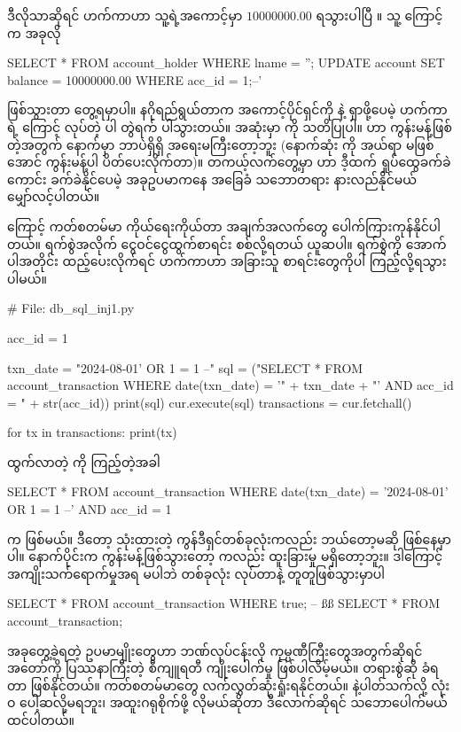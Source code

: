 ဒီလိုသာဆိုရင် ဟက်ကာဟာ သူ့ရဲ့အကောင့်မှာ $10000000.00$ ရသွားပါပြီ \fEn{(!)}။ သူ့  ကြောင့်  က အခုလို
\begin{sql}
SELECT * FROM account_holder WHERE lname = '';
UPDATE account SET balance = 10000000.00 WHERE acc_id = 1;--'
\end{sql}
ဖြစ်သွားတာ တွေ့ရမှာပါ။ နဂိုရည်ရွယ်တာက အကောင့်ပိုင်ရှင်ကို  နဲ့ ရှာဖို့ပေမဲ့ ဟက်ကာရဲ့  ကြောင့်  လုပ်တဲ့  ပါ တွဲရက် ပါသွားတယ်။ အဆုံးမှာ  ကို သတိပြုပါ။ \fCode{--} ဟာ  ကွန်းမန့်ဖြစ်တဲ့အတွက် နောက်မှာ ဘာပဲရှိရှိ အရေးမကြီးတော့ဘူး (နောက်ဆုံး  ကို အယ်ရာ မဖြစ်အောင် ကွန်းမန့်ပါ ပိတ်ပေးလိုက်တာ)။ တကယ့်လက်တွေ့မှာ  ဟာ ဒီ့ထက် ရှုပ်ထွေခက်ခဲကောင်း ခက်ခဲနိုင်ပေမဲ့ အခုဥပမာကနေ အခြေခံ သဘောတရား နားလည်နိုင်မယ် မျှော်လင့်ပါတယ်။

 ကြောင့် ကတ်စတမ်မာ ကိုယ်ရေးကိုယ်တာ အချက်အလက်တွေ ပေါက်ကြားကုန်နိုင်ပါတယ်။ ရက်စွဲအလိုက် ငွေဝင်ငွေထွက်စာရင်း စစ်လို့ရတယ် ယူဆပါ။ ရက်စွဲကို အောက်ပါအတိုင်း ထည့်ပေးလိုက်ရင် ဟက်ကာဟာ အခြားသူ စာရင်းတွေကိုပါ ကြည့်လို့ရသွားပါမယ်။ 
%
\begin{py}
# File: db_sql_inj1.py 

acc_id = 1

txn_date = "2024-08-01' OR 1 = 1 --"
sql = ("SELECT * FROM account_transaction WHERE date(txn_date) = '" 
       + txn_date + "' AND acc_id = " + str(acc_id))
print(sql)
cur.execute(sql)
transactions = cur.fetchall()

for tx in transactions:
    print(tx)
\end{py}
%
ထွက်လာတဲ့  ကို ကြည့်တဲ့အခါ
\begin{sql}
SELECT * FROM account_transaction 
WHERE date(txn_date) = '2024-08-01' OR 1 = 1 --' AND acc_id = 1
\end{sql}
 က  ဖြစ်မယ်။ ဒီတော့  သုံးထားတဲ့  ကွန်ဒီရှင်တစ်ခုလုံးကလည်း ဘယ်တော့မဆို  ဖြစ်နေမှာပါ။ နောက်ပိုင်းက ကွန်းမန့်ဖြစ်သွားတော့  ကလည်း ထူးခြားမှု မရှိတော့ဘူး။ ဒါကြောင့် အကျိုးသက်ရောက်မှုအရ  မပါဘဲ  တစ်ခုလုံး  လုပ်တာနဲ့ တူတူဖြစ်သွားမှာပါ
\begin{sql}
SELECT * FROM account_transaction WHERE true;
-- ßß
SELECT * FROM account_transaction;
\end{sql}

အခုတွေ့ခဲ့ရတဲ့ ဥပမာမျိုးတွေဟာ ဘဏ်လုပ်ငန်းလို ကုမ္ပဏီကြီးတွေအတွက်ဆိုရင် အတော်ကို ပြဿ\allowbreak နာကြီးတဲ့ စီကျူရတီ ကျိုးပေါက်မှု ဖြစ်ပါလိမ့်မယ်။ တရားစွဲဆို ခံရတာ ဖြစ်နိုင်တယ်။ ကတ်စတမ်မာတွေ လက်လွှတ်ဆုံးရှုံးရနိုင်တယ်။  နဲ့ပါတ်သက်လို့ လုံးဝ ပေါ့ဆလို့မရဘူး၊ အထူးဂရုစိုက်ဖို့ လိုမယ်ဆိုတာ ဒီလောက်ဆိုရင်  သဘောပေါက်မယ် ထင်ပါတယ်။ 






